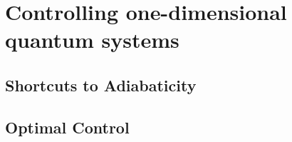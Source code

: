 
\chapter{Controlling one-dimensional quantum systems} \label{ch-1d}

\section{Shortcuts to Adiabaticity}
\section{Optimal Control}
